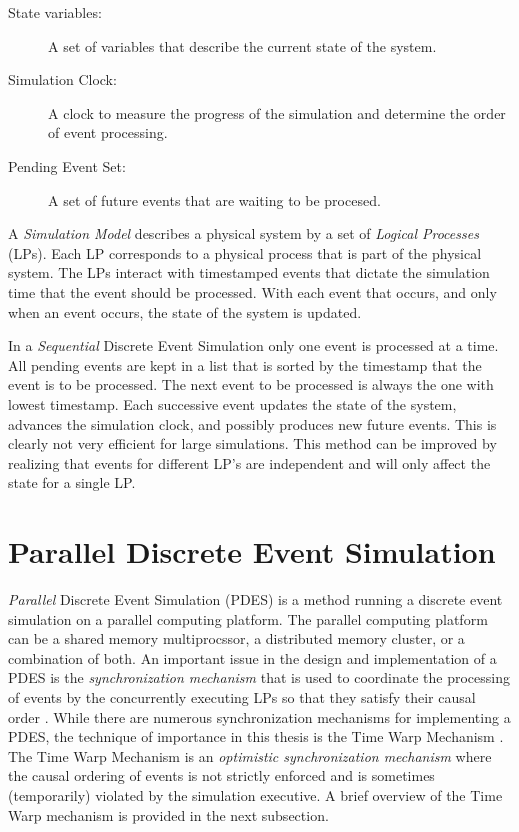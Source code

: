 \documentclass[11pt]{book}
\begin{document}
\begin{description}
\item[State variables: ] A set of variables that describe the current state of the system.
\item[Simulation Clock: ] A clock to measure the progress of the simulation and determine
  the order of event processing.
\item[Pending Event Set: ] A set of future events that are waiting to be procesed.
\end{description}

\noindent
A \emph{Simulation Model} describes a physical system by a set of \emph{Logical Processes}
(LPs).  Each LP corresponds to a physical process that is part of the physical system.
The LPs interact with timestamped events that dictate the simulation time that the event
should be processed.  With each event that occurs, and only when an event occurs, the
state of the system is updated.

In a \emph{Sequential} Discrete Event Simulation only one event is processed at a time.
All pending events are kept in a list that is sorted by the timestamp that the event is to
be processed.  The next event to be processed is always the one with lowest timestamp.
Each successive event updates the state of the system, advances the simulation clock, and
possibly produces new future events.  This is clearly not very efficient for large
simulations.  This method can be improved by realizing that events for different LP's are
independent and will only affect the state for a single LP.

\section{Parallel Discrete Event Simulation}

\emph{Parallel} Discrete Event Simulation (PDES) is a method running a discrete event
simulation on a parallel computing platform.  The parallel computing platform can be a
shared memory multiprocssor, a distributed memory cluster, or a combination of both.  An
important issue in the design and implementation of a PDES is the \emph{synchronization
mechanism} that is used to coordinate the processing of events by the concurrently
executing LPs so that they satisfy their causal order \cite{lamport-78}.  While there are
numerous synchronization mechanisms for implementing a PDES, the technique of importance
in this thesis is the Time Warp Mechanism \cite{jefferson-85,fujimoto-90,fujimoto-00}.
The Time Warp Mechanism is an \emph{optimistic synchronization mechanism} where the causal
ordering of events is not strictly enforced and is sometimes (temporarily) violated by the
simulation executive.  A brief overview of the Time Warp mechanism is provided in the next
subsection.
\end{document}

